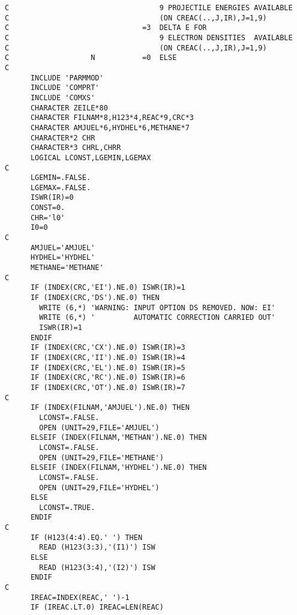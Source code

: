 \documentclass[12pt]{article}
\begin{document}
\begin{small}
\begin{verbatim}
C                                   9 PROJECTILE ENERGIES AVAILABLE
C                                   (ON CREAC(..,J,IR),J=1,9)
C                               =3  DELTA E FOR
C                                   9 ELECTRON DENSITIES  AVAILABLE
C                                   (ON CREAC(..,J,IR),J=1,9)
C                   N           =0  ELSE
C
      INCLUDE 'PARMMOD'
      INCLUDE 'COMPRT'
      INCLUDE 'COMXS'
      CHARACTER ZEILE*80
      CHARACTER FILNAM*8,H123*4,REAC*9,CRC*3
      CHARACTER AMJUEL*6,HYDHEL*6,METHANE*7
      CHARACTER*2 CHR
      CHARACTER*3 CHRL,CHRR
      LOGICAL LCONST,LGEMIN,LGEMAX
C
      LGEMIN=.FALSE.
      LGEMAX=.FALSE.
      ISWR(IR)=0
      CONST=0.
      CHR='l0'
      I0=0
C
      AMJUEL='AMJUEL'
      HYDHEL='HYDHEL'
      METHANE='METHANE'
C
      IF (INDEX(CRC,'EI').NE.0) ISWR(IR)=1
      IF (INDEX(CRC,'DS').NE.0) THEN
        WRITE (6,*) 'WARNING: INPUT OPTION DS REMOVED. NOW: EI'
        WRITE (6,*) '         AUTOMATIC CORRECTION CARRIED OUT'
        ISWR(IR)=1
      ENDIF
      IF (INDEX(CRC,'CX').NE.0) ISWR(IR)=3
      IF (INDEX(CRC,'II').NE.0) ISWR(IR)=4
      IF (INDEX(CRC,'EL').NE.0) ISWR(IR)=5
      IF (INDEX(CRC,'RC').NE.0) ISWR(IR)=6
      IF (INDEX(CRC,'OT').NE.0) ISWR(IR)=7
C
      IF (INDEX(FILNAM,'AMJUEL').NE.0) THEN
        LCONST=.FALSE.
        OPEN (UNIT=29,FILE='AMJUEL')
      ELSEIF (INDEX(FILNAM,'METHAN').NE.0) THEN
        LCONST=.FALSE.
        OPEN (UNIT=29,FILE='METHANE')
      ELSEIF (INDEX(FILNAM,'HYDHEL').NE.0) THEN
        LCONST=.FALSE.
        OPEN (UNIT=29,FILE='HYDHEL')
      ELSE
        LCONST=.TRUE.
      ENDIF
C
      IF (H123(4:4).EQ.' ') THEN
        READ (H123(3:3),'(I1)') ISW
      ELSE
        READ (H123(3:4),'(I2)') ISW
      ENDIF
C
      IREAC=INDEX(REAC,' ')-1
      IF (IREAC.LT.0) IREAC=LEN(REAC)


\end{verbatim}
\end{small}
\end{document}
